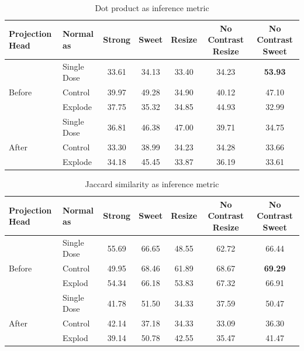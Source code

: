 \begin{table}[H]
  \centering
  \begin{tabular}{@{}llccccc@{}}
  \toprule
  Projection Head & Normal as       & Strong & Sweet & Resize & No Contrast Resize & No Contrast Sweet \\ \midrule
                  & Single Dose    & 33.61      & 34.13     & 33.40      & 34.23                  & \textbf{53.93}                 \\
  Before          & Control        & 39.97      & 49.28     & 34.90      & 40.12                  & 47.10                 \\
                  & Explode         & 37.75      & 35.32     & 34.85      & 44.93                  & 32.99                 \\ \midrule
                  & Single Dose    & 36.81      & 46.38     & 47.00      & 39.71                  & 34.75                 \\
  After           & Control        & 33.30      & 38.99     & 34.23      & 34.28                  & 33.66                 \\
                  & Explode         & 34.18      & 45.45     & 33.87      & 36.19                  & 33.61                 \\ \bottomrule
  \end{tabular}
  \caption{Dot product as inference metric}
  \label{tab:table_dot}
\end{table}

\begin{table}[H]
  \centering
  \begin{tabular}{@{}llccccc@{}}
  \toprule
  Projection Head & Normal as       & Strong & Sweet & Resize & No Contrast Resize & No Contrast Sweet \\ \midrule
                  & Single Dose    & 55.69      & 66.65     & 48.55      & 62.72                  & 66.44                 \\
  Before          & Control        & 49.95      & 68.46     & 61.89      & 68.67                  & \textbf{69.29}                 \\
                  & Explod         & 54.34      & 66.18     & 53.83      & 67.32                  & 66.91                 \\ \midrule
                  & Single Dose    & 41.78      & 51.50     & 34.33      & 37.59                  & 50.47                 \\
  After           & Control        & 42.14      & 37.18     & 34.33      & 33.09                  & 36.30                 \\
                  & Explod         & 39.14      & 50.78     & 42.55      & 35.47                  & 41.47                 \\ \bottomrule
  \end{tabular}
  \caption{Jaccard similarity as inference metric}
  \label{tab:table_jac}
\end{table}

